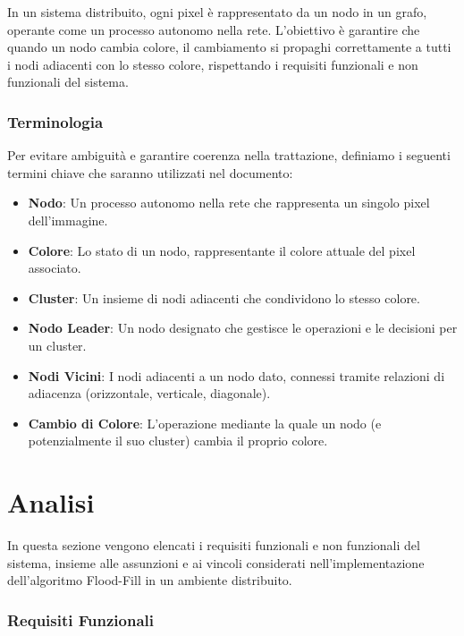 \documentclass[12pt, a4paper]{report}
\begin{document}
In un sistema distribuito, ogni pixel è rappresentato da un nodo in un grafo, operante come un processo autonomo nella rete. L'obiettivo è garantire che quando un nodo cambia colore, il cambiamento si propaghi correttamente a tutti i nodi adiacenti con lo stesso colore, rispettando i requisiti funzionali e non funzionali del sistema.

\subsection{Terminologia}

Per evitare ambiguità e garantire coerenza nella trattazione, definiamo i seguenti termini chiave che saranno utilizzati nel documento:

\begin{itemize}
    \item \textbf{Nodo}: Un processo autonomo nella rete che rappresenta un singolo pixel dell'immagine.
    \item \textbf{Colore}: Lo stato di un nodo, rappresentante il colore attuale del pixel associato.
    \item \textbf{Cluster}: Un insieme di nodi adiacenti che condividono lo stesso colore.
    \item \textbf{Nodo Leader}: Un nodo designato che gestisce le operazioni e le decisioni per un cluster.
    \item \textbf{Nodi Vicini}: I nodi adiacenti a un nodo dato, connessi tramite relazioni di adiacenza (orizzontale, verticale, diagonale).
    \item \textbf{Cambio di Colore}: L'operazione mediante la quale un nodo (e potenzialmente il suo cluster) cambia il proprio colore.
\end{itemize}

\chapter{Analisi}

In questa sezione vengono elencati i requisiti funzionali e non funzionali del sistema, insieme alle assunzioni e ai vincoli considerati nell'implementazione dell'algoritmo Flood-Fill in un ambiente distribuito.

\subsection{Requisiti Funzionali}
\end{document}
